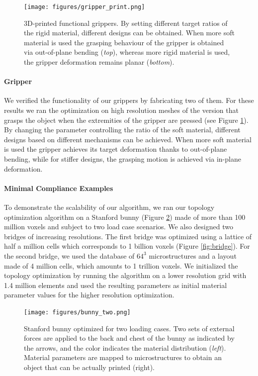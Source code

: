 		\begin{figure}[h]
			\centering
			\texttt{[image: figures/gripper\_print.png]}
			\caption{3D-printed functional grippers. By setting different target ratios of the rigid material, different designs can be obtained. 
				When more soft material is used the grasping behaviour of the gripper is obtained via out-of-plane bending (\emph{top}), whereas more rigid material is used, the gripper deformation remains planar (\emph{bottom}).}  
			
			\label{fig:gripper_printed}
		\end{figure}
		
		\paragraph{Gripper}
		We verified the functionality of our grippers by fabricating two of them. For these results we ran the optimization on high resolution meshes of the version that grasps the object when the extremities of the gripper are pressed (see Figure \ref{fig:gripper_printed}). By changing the parameter controlling the ratio of the soft material, different designs based on different mechanisms can be achieved. When more soft material is used the gripper achieves its target deformation thanks to out-of-plane bending, while for stiffer designs, the grasping motion is achieved via in-plane deformation.
		\paragraph*{Minimal Compliance Examples}
		To demonstrate the scalability of our algorithm, we ran our topology optimization algorithm on a Stanford bunny (Figure \ref{fig:bunny}) made of more than 100 million voxels and subject to two load case scenarios.
		We also designed two bridges of increasing resolutions. The first bridge was optimized using a lattice of half a million cells which corresponds to 1 billion voxels (Figure \ref{fig:bridge}). For the second bridge, we used the database of $64^3$ microstructures and a layout made of 4 million cells, which amounts to 1 trillion voxels. We initialized the topology optimization by running the algorithm on a lower resolution grid with 1.4 million elements and used the resulting parameters as initial material parameter values for the higher resolution optimization. 	
		\begin{figure}
			\centering	
			\texttt{[image: figures/bunny\_two.png]}
			\caption{Stanford bunny optimized for two loading cases. Two sets of external forces are applied to the back and chest of the bunny as indicated by the arrows, and the color indicates the material distribution (\emph{left}). Material parameters are mapped to microstructures to obtain an object that can be actually printed (right).
				\label{fig:bunny}}
		\end{figure}
		
